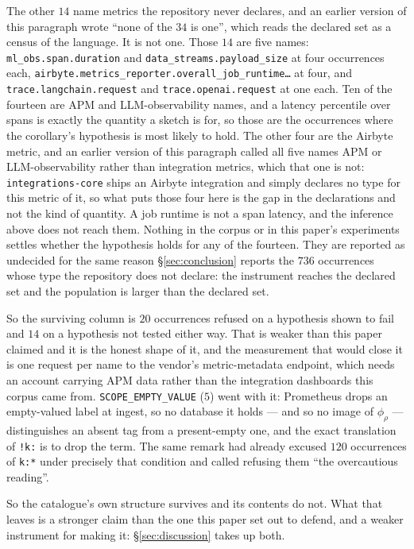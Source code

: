 The other $14$ name metrics the repository never declares, and an earlier version of
this paragraph wrote ``none of the $34$ is one'', which reads the declared set as a
census of the language. It is not one. Those $14$ are five names:
\texttt{ml\_obs.span.duration} and \texttt{data\_streams.payload\_size} at four
occurrences each, \texttt{airbyte.metrics\_reporter.overall\_job\_runtime\ldots} at
four, and \texttt{trace.langchain.request} and \texttt{trace.openai.request} at one
each. Ten of the fourteen are APM and LLM-observability names, and a latency percentile
over spans is exactly the quantity a sketch is for, so those are the occurrences where
the corollary's hypothesis is most likely to hold. The other four are the Airbyte
metric, and an earlier version of this paragraph called all five names APM or
LLM-observability rather than integration metrics, which that one is not:
\texttt{integrations-core} ships an Airbyte integration and simply declares no type for
this metric of it, so what puts those four here is the gap in the declarations and not
the kind of quantity. A job runtime is not a span latency, and the inference above does
not reach them. Nothing in the corpus or in this paper's experiments settles whether the
hypothesis holds for any of the fourteen. They are reported
as undecided for the same reason \S\ref{sec:conclusion} reports the $736$ occurrences
whose type the repository does not declare: the instrument reaches the declared set and
the population is larger than the declared set.

So the surviving column is $20$ occurrences refused on a hypothesis shown to fail and
$14$ on a hypothesis not tested either way. That is weaker than this paper claimed and
it is the honest shape of it, and the measurement that would close it is one request per
name to the vendor's metric-metadata endpoint, which needs an account carrying APM data
rather than the integration dashboards this corpus came from.
\texttt{SCOPE\_EMPTY\_VALUE} ($5$) went with it: Prometheus drops an empty-valued label
at ingest, so no database it holds --- and so no image of $\phi_\rho$ --- distinguishes
an absent tag from a present-empty one, and the exact translation of \texttt{!k:} is to
drop the term. The same remark had already excused $120$ occurrences of \texttt{k:*}
under precisely that condition and called refusing them ``the overcautious reading''.

So the catalogue's own structure survives and its contents do not. What that leaves is a
stronger claim than the one this paper set out to defend, and a weaker instrument for
making it: \S\ref{sec:discussion} takes up both.

